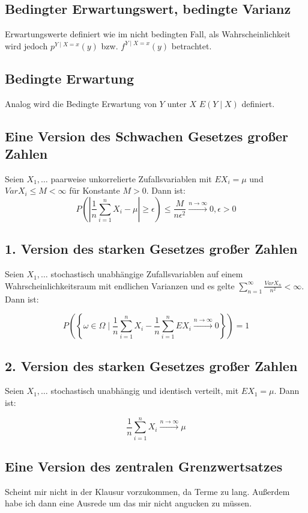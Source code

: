 \documentclass{scrartcl}%
\begin{document}
\subsection{Bedingter Erwartungswert, bedingte Varianz}
Erwartungswerte definiert wie im nicht bedingten Fall, als Wahrscheinlichkeit wird jedoch $p^{Y\mid X=x}(y)$ bzw. $f^{Y\mid X=x} (y)$ betrachtet.

\subsection{Bedingte Erwartung}
Analog wird die Bedingte Erwartung von $Y$ unter $X$ $E(Y\mid X)$ definiert.

\subsection{Eine Version des Schwachen Gesetzes großer Zahlen}
Seien $X_1, \ldots$ paarweise unkorrelierte Zufallsvariablen mit $EX_i = \mu$ und $Var X_i \leq M < \infty$ für Konstante $M > 0$. Dann ist:
\[P\left(\left\vert {\frac{1}{n}\sum\limits_{i=1}^n X_i - \mu}\right\vert \geq \epsilon\right) \leq \frac{M}{n\epsilon^2} \xrightarrow{n \to \infty} 0, \epsilon > 0\]

\subsection{1. Version des starken Gesetzes großer Zahlen}
Seien $X_1,\ldots$ stochastisch unabhängige Zufallsvariablen auf einem Wahrscheinlichkeitsraum mit endlichen Varianzen und es gelte $\sum_{n=1}^\infty \frac{Var X_n}{n^2} < \infty$. Dann ist:

\[P \left(\left \{ \omega \in \Omega \mid \frac{1}{n}\sum\limits_{i=1}^nX_i - \frac{1}{n} \sum\limits_{i=1}^n EX_i \xrightarrow{n \to \infty} 0 \right \} \right) = 1\]

\subsection{2. Version des starken Gesetzes großer Zahlen}
Seien $X_1, \ldots$ stochastisch unabhängig und identisch verteilt, mit $EX_1 = \mu$. Dann ist:

\[\frac{1}{n}\sum\limits_{i=1}^n X_i \xrightarrow{n \to \infty} \mu\]

\subsection{Eine Version des zentralen Grenzwertsatzes}
Scheint mir nicht in der Klausur vorzukommen, da Terme zu lang. Außerdem habe ich dann eine Ausrede um das mir nicht angucken zu müssen. 
\end{document}
